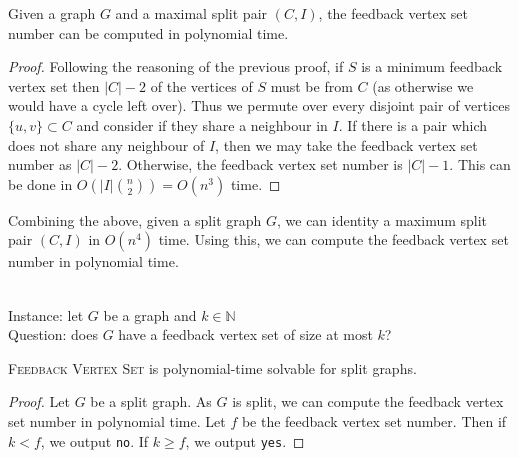 \begin{solution}
    \begin{lemma}
        Given a graph $G$ and a maximal split pair $(C, I)$, the feedback vertex set number can be computed in polynomial time.
    \end{lemma}

    \begin{proof}
        Following the reasoning of the previous proof, if $S$ is a minimum feedback vertex set then $\lvert C \rvert - 2$ of the vertices of $S$ must be from $C$ (as otherwise we would have a cycle left over). Thus we permute over every disjoint pair of vertices $\{u, v\} \subset C$ and consider if they share a neighbour in $I$. If there is a pair which does not share any neighbour of $I$, then we may take the feedback vertex set number as $\lvert C \rvert - 2$. Otherwise, the feedback vertex set number is $\lvert C \rvert - 1$. This can be done in $O\left(\lvert I \rvert\binom{n}{2}\right) = O(n^3)$ time.
    \end{proof}

    Combining the above, given a split graph $G$, we can identity a maximum split pair $(C,I)$ in $O(n^4)$ time. Using this, we can compute the feedback vertex set number in polynomial time.
    \vspace{1em}
    \begin{problem}
    \hspace{0em}\\
    Instance: let $G$ be a graph and $k \in \mathbb N$ \\
    Question: does $G$ have a feedback vertex set of size at most $k$?
    \end{problem}
    \vspace{1em}

    \begin{corollary}
        \textsc{Feedback Vertex Set} is polynomial-time solvable for split graphs.
    \end{corollary}

    \begin{proof}
        Let $G$ be a split graph. As $G$ is split, we can compute the feedback vertex set number in polynomial time. Let $f$ be the feedback vertex set number. Then if $k < f$, we output \texttt{no}. If $k \geq f$, we output \texttt{yes}.
    \end{proof}
\end{solution}